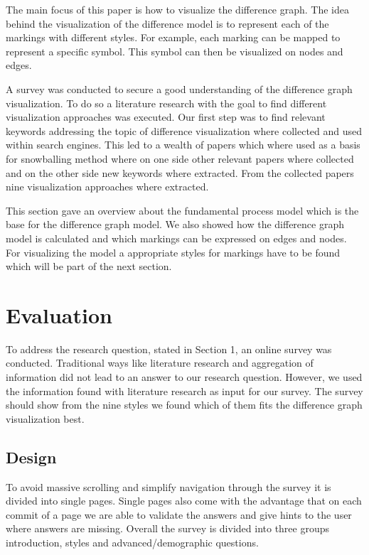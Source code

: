 \documentclass{llncs}
\begin{document}
The main  focus of this paper is how to visualize the difference graph. The idea behind the visualization of the difference model is to represent each of the markings with different styles. For example, each marking can be mapped to represent a specific symbol. This symbol can then be visualized on nodes and edges.

A survey was conducted to secure a good understanding of the difference graph visualization. To do so a literature research with the goal to find different visualization approaches was executed. Our first step was to find relevant keywords addressing the topic of difference visualization where collected and used within search engines. This led to a wealth of papers which where used as a basis for snowballing method where on one side other relevant papers where collected and on the other side new keywords where extracted. From the collected papers nine visualization approaches where extracted.

This section gave an overview about the fundamental process model which is the base for the difference graph model. We also showed how the difference graph model is calculated and which markings can be expressed on edges and nodes. For visualizing the model a appropriate styles for markings have to be found which will be part of the next section.

\section{Evaluation} %
\label{sec:Evaluation} %
To address the research question, stated in Section 1, an online survey was conducted. Traditional ways like literature research and aggregation of information did not lead to an answer to our research question. However, we used the information found with literature research as input for our survey. The survey should show from the nine styles we found which of them fits the difference graph visualization best.


\subsection{Design} %
\label{sec:Design}
To avoid massive scrolling and simplify navigation through the survey it is divided into single pages. Single pages also come with the advantage that on each commit of a page we are able to validate the answers and give hints to the user where answers are missing. Overall the survey is divided into three groups introduction, styles and advanced/demographic questions.
\end{document}
